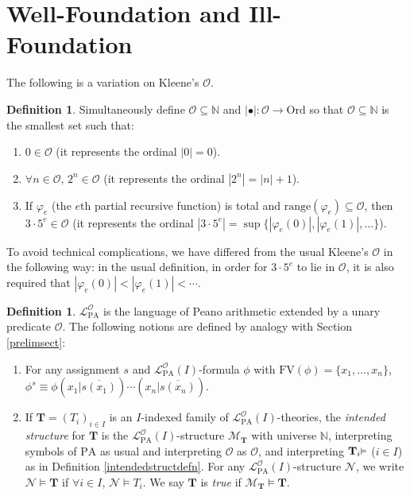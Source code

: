 \documentclass[reqno]{article}
\theoremstyle{definition}
\newtheorem{definition}[theorem]{Definition}
\def\N{\mathbb{N}}
\def\L{\mathscr{L}}
\def\M{\mathscr{M}}
\def\T{\mathbf{T}}
\def\O{\mathcal{O}}
\def\FV{\mathrm{FV}}
\def\LPO{\L^{\mathcal{O}}_{\mathrm{PA}}}
\renewcommand{\Pr}[1]{\T_{#1}\mbox{\small${\vDash}$}}
\begin{document}
\section{Well-Foundation and Ill-Foundation}

The following is a variation on Kleene's $\O$.

\begin{definition}
\label{kleeneodefn}
Simultaneously define $\O\subseteq\N$
and $|\bullet|:\O\to\mathrm{Ord}$ so that
$\O\subseteq\N$
is the smallest set such that:
\begin{enumerate}
\item $0\in\O$ (it represents the ordinal $|0|=0$).
\item $\forall n\in\O$, $2^n\in \O$ (it represents the ordinal $|2^n|=|n|+1$).
\item If $\varphi_e$ (the $e$th partial recursive function) is total
and $\mathrm{range}(\varphi_e)\subseteq\O$,
then $3\cdot 5^e\in\O$
(it represents the ordinal $|3\cdot 5^e|=\sup\{|\varphi_e(0)|,|\varphi_e(1)|,\ldots\}$).
\end{enumerate}
\end{definition}

To avoid technical complications,
we have differed from the usual Kleene's $\O$ in the following way:
in the usual definition, in order for $3\cdot5^e$ to lie in $\O$,
it is also required that $|\varphi_e(0)|<|\varphi_e(1)|<\cdots$.


\begin{definition}
$\LPO$ is the language of Peano arithmetic extended by
a unary predicate $\O$.
The following notions are defined by analogy with Section \ref{prelimsect}:
\begin{enumerate}
\item For any assignment $s$ and $\LPO(I)$-formula $\phi$ with $\FV(\phi){=}\{x_1,\ldots,x_n\}$,
$\phi^s\equiv\phi(x_1|\overline{s(x_1)})\cdots(x_n|\overline{s(x_n)})$.
\item If $\T=(T_i)_{i\in I}$ is an $I$-indexed family of $\LPO(I)$-theories,
the \emph{intended structure} for $\T$ is the $\LPO(I)$-structure
$\M_\T$ with universe $\N$, interpreting symbols of $\mathrm{PA}$ as usual
and interpreting $\O$ as $\mathcal O$, and interpreting $\Pr i$ ($i\in I$)
as in Definition \ref{intendedstructdefn}.
For any $\LPO(I)$-structure $\mathscr N$, we write $\mathscr N\models \T$
if $\forall i\in I$, $\mathscr N\models T_i$.
We say $\T$ is \emph{true} if $\M_\T\models\T$.
\end{enumerate}
\end{definition}
\end{document}
